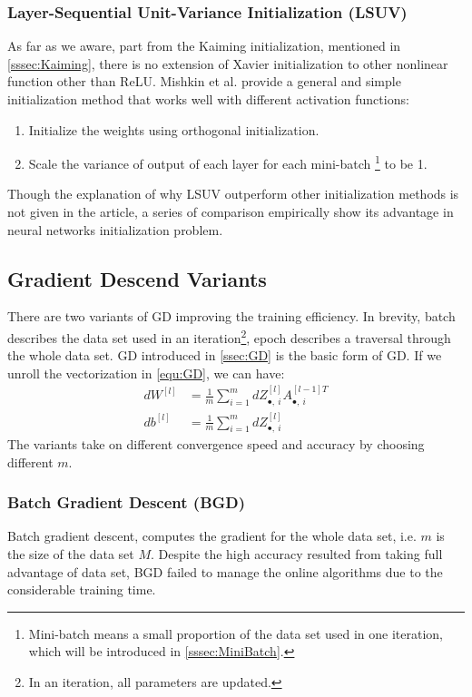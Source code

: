 \subsubsection{Layer-Sequential Unit-Variance Initialization (LSUV)}
As far as we aware, part from the Kaiming initialization, mentioned in 
\autoref{sssec:Kaiming}, there is no extension of Xavier initialization to 
other nonlinear function other than ReLU. Mishkin et al. \parencite{mishkin2015all}
provide a general and simple initialization method that works well with different 
activation functions:
\begin{enumerate}
    \item[1.] Initialize the weights using orthogonal initialization.
    \item[2.] Scale the variance of output of each layer for each mini-batch 
    \footnote{Mini-batch means a small proportion of the data set used in one 
    iteration, which will be introduced in \autoref{sssec:MiniBatch}.} to  
    be 1.
\end{enumerate}
Though the explanation of why LSUV outperform other initialization methods is
not given in the article, a series of comparison empirically show its advantage
in neural networks initialization problem.


\subsection{Gradient Descend Variants}
There are two variants of GD improving the training efficiency. In brevity,
batch describes the data set used in an iteration\footnote{In an iteration, 
all parameters are updated.}, epoch describes a traversal through the whole 
data set. GD introduced in \autoref{ssec:GD} is the basic form of GD. If 
we unroll the vectorization in \autoref{equ:GD}, we can have:
\begin{equation}
    \begin{split}
        dW^{[l]} & = \frac{1}{m}\sum\limits_{i=1}^mdZ_{\bullet,\ i}^{[l]}A_{\bullet,\ i}^{[l-1]T} \\
        db^{[l]} & = \frac{1}{m}\sum\limits_{i=1}^mdZ_{\bullet,\ i}^{[l]}
    \end{split}
\end{equation}  
The variants take on different convergence speed and accuracy by choosing 
different $ m $.

\subsubsection{Batch Gradient Descent (BGD)}
Batch gradient descent, computes the gradient for the whole data set, i.e. 
$ m $ is the size of the data set $ M $. Despite the high accuracy resulted 
from taking full advantage of data set, BGD failed to 
manage the online algorithms due to the considerable training time.


